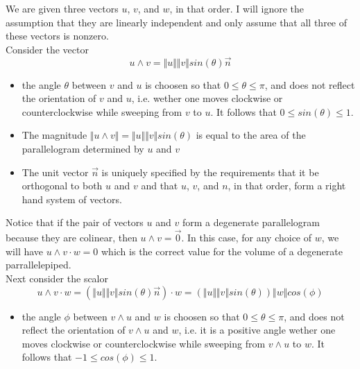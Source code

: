 \documentclass[12pt,letterpaper]{hmcpset}
\begin{document}
\begin{solution}  

We are given three vectors $u$, $v$, and  $w$,  in that order.  I will ignore the assumption that they are linearly independent and only assume that all three of these vectors is nonzero.\\

Consider the vector 
\[u\wedge v = \Vert u \Vert \Vert v \Vert sin(\theta) \vec{n}\]

\begin{itemize}

\item the angle $\theta$ between $v$ and $u$ is choosen so that $0\leq \theta \leq \pi$, and does not reflect the orientation of $v$ and $u$, i.e. wether one moves clockwise or counterclockwise while sweeping from $v$ to $u$. It follows
that $0\leq sin(\theta) \leq 1$.

\item The magnitude $\Vert u \wedge v \Vert = \Vert u \Vert \Vert v \Vert sin(\theta)$ is equal to the area of the parallelogram determined by $u$ and $v$

\item The unit vector $\vec{n}$ is uniquely specified by the requirements that it  be orthogonal to both $u$ and $v$ and  that $u$, $v$, and $n$, in that order, form a right hand system of vectors.

\end{itemize}

Notice that if the pair of vectors $u$ and $v$ form a degenerate parallelogram because they are colinear, then $u \wedge v = \vec0 $.  In this case, for any choice of $w$, we will have
$u\wedge v \cdot w = 0$ which is the correct value for the volume of a degenerate parrallelepiped.\\

Next consider the scalor 
\[ u\wedge v \cdot w = (\Vert u \Vert \Vert v \Vert sin(\theta) \vec{n})\cdot w =  (\Vert u \Vert \Vert v \Vert sin(\theta))\Vert w \Vert cos(\phi) \]

\begin{itemize}

\item the angle $\phi$ between $v\wedge u$ and $w$ is choosen so that $0\leq \theta \leq \pi$, and does not reflect the orientation of $v \wedge u$ and $w$, i.e. it is a positive angle wether one moves clockwise or counterclockwise while sweeping from
${v \wedge u}$ to $w$. It follows that ${-1 \leq cos(\phi) \leq 1}$.


\end{itemize}
\end{solution}
\end{document}

